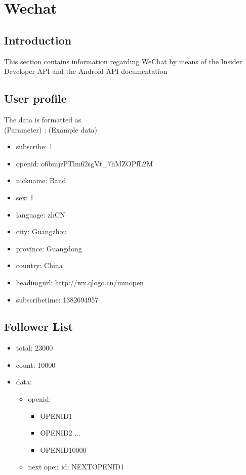 \documentclass{article}
\begin{document}
\cleardoublepage
\section{Wechat}
\subsection{Introduction}
This section contains information regarding WeChat by means of the Insider Developer API and the Android API documentation
\subsection{User profile}
The data is formatted as \\
(Parameter) : (Example data)
\begin{itemize}
	\item subscribe: 1
	\item openid: o6bmjrPTlm62sgVt\_7hMZOPfL2M
	\item nickname: Band
	\item sex: 1
	\item language: zhCN
	\item city: Guangzhou
	\item province: Guangdong
	\item country: China 
	\item headimgurl:   http://wx.qlogo.cn/mmopen
	\item subscribetime: 1382694957
\end{itemize}

\subsection{Follower List}
\begin{itemize}
	\item total: 23000
	\item count: 10000
	\item data:
    
    \begin{itemize}
    \item openid:
    \begin{itemize}
        \item OPENID1
       	\item OPENID2
        ...
        \item OPENID10000
     \end{itemize}
	\item  next open id: NEXTOPENID1
	\end{itemize}
\end{itemize}
\end{document}
